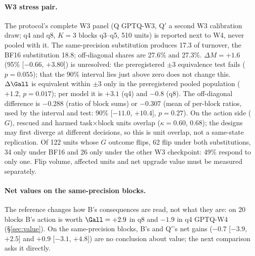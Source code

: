 \paragraph{W3 stress pair.} The protocol's complete W3 panel (Q GPTQ-W3, Q$'$ a second W3 calibration draw; q4 and q8, $K=3$ blocks q3--q5, 510 units) is reported next to W4, never pooled with it. The same-precision substitution produces 17.3\pp{} of turnover, the BF16 substitution 18.8\pp{}; off-diagonal shares are 27.6\% and 27.3\%. %
$\Delta M=+1.6$\pp{} (95\% [$-0.66$, $+3.80$]) is unresolved: the preregistered $\pm$3\pp{} equivalence test fails ($p=0.055$); that the 90\% interval lies just above zero does not change this. $\Delta\Gall$ is equivalent within $\pm$3\pp{} only in the preregistered pooled population ($+1.2$, $p=0.017$); per model it is $+3.1$ (q4) and $-0.8$\pp{} (q8). The off-diagonal difference is $-0.288$ (ratio of block sums) or $-0.307$ (mean of per-block ratios, used by the interval and test: 90\% [$-11.0$, $+10.4]$, $p=0.27$). %
On the action side ($G$), rescued and harmed task$\times$block units overlap ($\kappa=0.60$, $0.68$); the designs may first diverge at different decisions, so this is unit overlap, not a same-state replication. Of 122 units whose $G$ outcome flips, 62 flip under both substitutions, 34 only under BF16 and 26 only under the other W3 checkpoint: 49\% respond to only one. Flip volume, affected units and net upgrade value must be measured separately. %

\paragraph{Net values on the same-precision blocks.} The reference changes how B's consequences are read, not what they are: on 20 blocks B's action is worth $\Gall=+2.9$\pp{} in q8 and $-1.9$\pp{} in q4 GPTQ-W4 (\S\ref{sec:value}). On the same-precision blocks, B's and Q$'$'s net gains ($-0.7$ [$-3.9$, $+2.5$] and $+0.9$ [$-3.1$, $+4.8$]\pp{}) are no conclusion about value; the next comparison asks it directly. %

